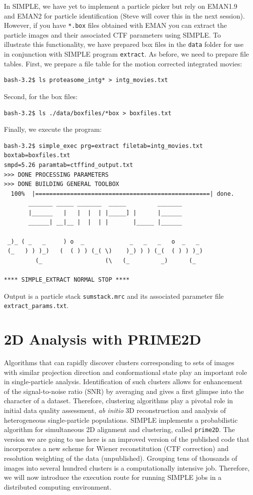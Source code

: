 \documentclass[a4paper,11pt]{article}
\newcommand{\prgname}[1]{\textcolor{NavyBlue}{\texttt{#1}}}
\begin{document}
In SIMPLE, we have yet to implement a particle picker but rely on EMAN1.9 and EMAN2 for particle identification (Steve will cover this in the next session). However, if you have \texttt{*.box} files obtained with EMAN you can extract the particle images and their associated CTF parameters using SIMPLE. To illustrate this functionality, we have prepared box files in the \texttt{data} folder for use in conjunction with SIMPLE program \prgname{extract}. As before, we need to prepare file tables. First, we prepare a file table for the motion corrected integrated movies:
\begin{verbatim}
bash-3.2$ ls proteasome_intg* > intg_movies.txt
\end{verbatim}
Second, for the box files:
\begin{verbatim}
bash-3.2$ ls ./data/boxfiles/*box > boxfiles.txt
\end{verbatim}
Finally, we execute the program:
\begin{verbatim}
bash-3.2$ simple_exec prg=extract filetab=intg_movies.txt boxtab=boxfiles.txt
smpd=5.26 paramtab=ctffind_output.txt 
>>> DONE PROCESSING PARAMETERS
>>> DONE BUILDING GENERAL TOOLBOX
  100%  |==================================================| done.
       _______ _____ _______  _____         _______
       |______   |   |  |  | |_____] |      |______
       ______| __|__ |  |  | |       |_____ |______
 
 _)_ ( _   _     ) o  _             _   _   _   o  _   _
 (_   ) ) )_)   (  ( ) ) (_( \)    )_) ) ) (_(  ( ) ) )_)
         (_                  (\   (_         _)      (_

**** SIMPLE_EXTRACT NORMAL STOP ****
\end{verbatim}
Output is a particle stack \texttt{sumstack.mrc} and its associated parameter file \texttt{extract\_params.txt}.

\section{2D Analysis with PRIME2D}
Algorithms that can rapidly discover clusters corresponding to sets of images with similar projection direction and conformational state play an important role in single-particle analysis. Identification of such clusters allows for enhancement of the signal-to-noise ratio (SNR) by averaging and gives a first glimpse into the character of a dataset. Therefore, clustering algorithms play a pivotal role in initial data quality assessment, \textit{ab initio} 3D reconstruction and analysis of heterogeneous single-particle populations. SIMPLE implements a probabilistic algorithm for simultaneous 2D alignment and clustering, called \prgname{prime2D}. The version we are going to use here is an improved version of the published code \citep{reboul2016stochastic} that incorporates a new scheme for Wiener reconstitution (CTF correction) and resolution weighting of the data (unpublished). Grouping tens of thousands of images into several hundred clusters is a computationally intensive job. Therefore, we will now introduce the execution route for running SIMPLE jobs in a distributed computing environment.
\end{document}
